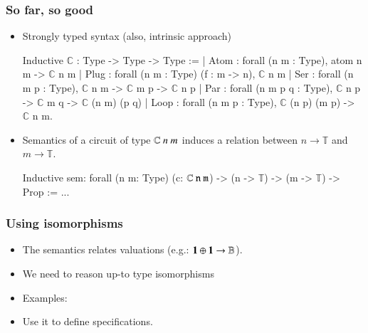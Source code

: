 \documentclass[9pt]{beamer}
\begin{document}
\newcommand\data{\mathbb{T}}

\begin{frame}[fragile]
  \frametitle{So far, so good}
  \begin{itemize}
  \item \alert{Strongly typed} syntax (also, \alert{intrinsic approach})
\begin{coq}
Inductive $\mathbb{C}$  : Type -> Type -> Type :=
| Atom : forall (n m : Type), atom n m -> $\mathbb{C}$ n m
| Plug : forall (n m : Type) (f : m -> n), $\mathbb{C}$ n m
| Ser   : forall (n m p : Type), $\mathbb{C}$ n m -> $\mathbb{C}$ m p -> $\mathbb{C}$ n p
| Par   : forall (n m p q : Type), $\mathbb{C}$ n p -> $\mathbb{C}$ m q ->  $\mathbb{C}$ (n \oplus m) (p \oplus q)
| Loop : forall (n m p : Type), $\mathbb{C}$ (n \oplus p) (m \oplus p) -> $\mathbb{C}$ n m.
\end{coq}       

\item   Semantics of a circuit of type $\mathbb{C}~n~m$ induces a \alert{relation} between $n
  \rightarrow \data$ and $m \rightarrow \data$.
  \begin{coq}
Inductive sem: forall (n m: Type) (c: $\mathbb{C}~\tt n~\tt m$) -> (n -> $\data$) -> (m -> $\data$) -> Prop := ...
\end{coq}
\end{itemize}
\end{frame}

\begin{frame}
  \frametitle{Using isomorphisms}

  \begin{itemize}
  \item The semantics relates \alert{valuations}   (e.g.: ${\bf 1} \oplus {\bf 1} \to \mathbb{B}$).
    \pause
  \item We need to reason \alert{up-to} type isomorphisms 
  \item Examples:
    \pause
  \item Use it to define specifications.
  \end{itemize}
\end{frame}
\end{document}
